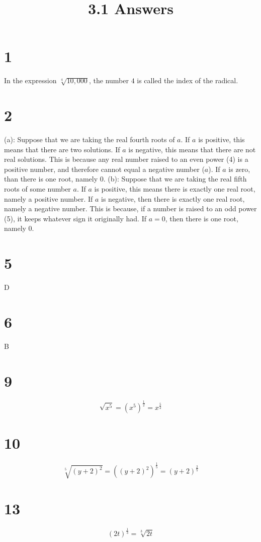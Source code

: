 \documentclass{article}
\title{3.1 Answers}
\theoremstyle{definition}
\begin{document}
\maketitle

\section*{1}
In the expression $\sqrt[4]{10,000}$, the number $4$ is called the index of the radical.

\section*{2}
(a): Suppose that we are taking the real fourth roots of $a$. If $a$ is positive, this means that there are two solutions. If $a$ is negative, this means that there 
are not real solutions. This is because any real number raised to an even power (4) is a positive number, and therefore cannot equal a negative number ($a$). If 
$a$ is zero, than there is one root, namely $0$. \newline
(b): Suppose that we are taking the real fifth roots of some number $a$. If $a$ is positive, this means there is exactly one real root, namely a positive number. 
If $a$ is negative, then there is exactly one real root, namely a negative number. This is because, if a number is raised to an odd power (5), it keeps whatever sign 
it originally had. If $a=0$, then there is one root, namely $0$.

\section*{5}
D

\section*{6}
B

\section*{9}
\[ \sqrt{x^5}=(x^5)^\frac{1}{2}=x^\frac{5}{2} \]

\section*{10}
\[ \sqrt[5]{(y+2)^2}=((y+2)^2)^\frac{1}{5}=(y+2)^\frac{2}{5} \]

\section*{13}
\[ (2t)^\frac{1}{3}=\sqrt[3]{2t} \]
\end{document}
